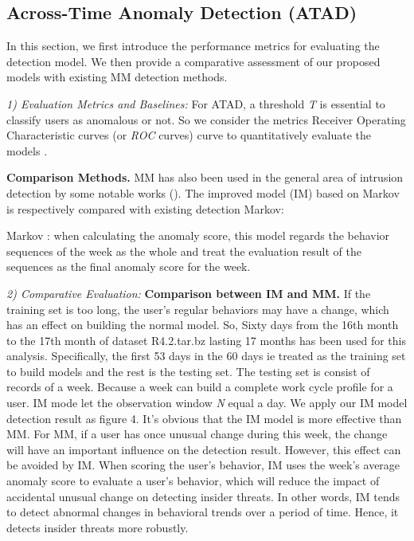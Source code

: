 \documentclass[conference]{IEEEtran}
\begin{document}
\subsection{Across-Time Anomaly Detection (ATAD)}
In this section, we first introduce the performance metrics for
evaluating the detection model. We then provide a
comparative assessment of our proposed models with existing MM detection methods.

\emph{1) Evaluation Metrics and Baselines:}
For ATAD, a threshold \emph{T} is essential to classify users as anomalous or not. 
So we consider the metrics Receiver Operating Characteristic curves (or \emph{ROC} curves) curve to quantitatively evaluate the models \cite{b17}.

\textbf{Comparison Methods.}
MM has also been used in the general area of intrusion detection by some notable works (\cite{b21}). The improved model (IM) based on Markov is respectively compared with existing detection Markov:

Markov \cite{b21}: when calculating the anomaly score, this model regards the behavior sequences of the week as the whole and treat the evaluation result of the sequences as the final anomaly score for the week.

\emph{2) Comparative Evaluation:} 
\textbf{Comparison between IM and MM.}
If the training set is too long, the user's regular behaviors may have a change, which has an effect on building the normal model. So, Sixty days from the 16th month to the 17th month of dataset R4.2.tar.bz lasting 17 months has been used for this analysis. Specifically, the first 53 days in the 60 days ie treated as the training set to build models and the rest is the testing set. The testing set is consist of records of a week. Because a week can build a complete work cycle profile for a user. IM mode let the observation window \emph{N} equal a day.
We apply our IM model detection result as figure 4. It's obvious that the IM model is more effective than MM. For MM, if a user has once unusual change during this week, the change will have an important influence on the detection result. However, this effect can be avoided by IM. When scoring the user's behavior, IM uses the week's average anomaly score to evaluate a user's behavior, which will reduce the impact of accidental unusual change on detecting insider threats.
In other words, IM tends to detect abnormal changes in behavioral trends over a period of time. Hence, it detects insider threats more robustly. 
\end{document}
